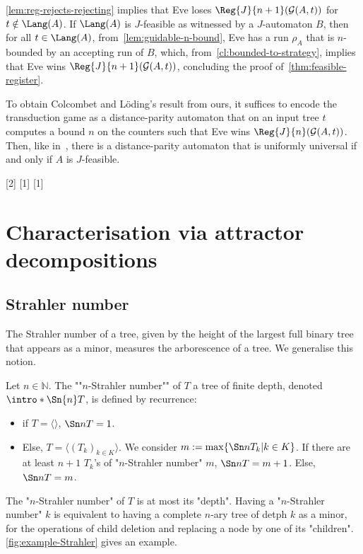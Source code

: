 \documentclass[a4paper,UKenglish,cleveref, autoref, thm-restate]{lipics-v2021}
\newcommand{\NN}{\mathbb{N}}
\newcommand{\F}{\mathcal{F}}
\newcommand{\G}{\mathcal{G}}
\begin{document}
\cref{lem:reg-rejects-rejecting} implies that Eve loses $\Reg{J}{n+1}(\G(A,t))$ for $t\notin \Lang(A)$. If $\Lang(A)$ is $J$-feasible as witnessed by a $J$-automaton $B$, then for all $t\in \Lang(A)$, from~\cref{lem:guidable-n-bound}, Eve has a run $\rho_A$ that is $n$-bounded by an accepting run of $B$, which, from~\cref{cl:bounded-to-strategy}, implies that Eve wins $\Reg{J}{n+1}(\G(A,t))$, concluding the proof of~\cref{thm:feasible-register}.

\begin{remark}\label{rmk:colcombet-loding}
To obtain Colcombet and L\"oding's result from ours, it suffices to encode the transduction game as a distance-parity automaton that on an input tree $t$ computes a bound $n$ on the counters such that Eve wins  $\Reg{J}{n}(\G(A,t))$. Then, like in~\cite[Lemma 3]{Guidable}, there is a distance-parity automaton that is uniformly universal if and only if $A$ is $J$-feasible.
\end{remark}  


\knowledgenewcommand{\Sn}[2]{}
\knowledgenewcommand{\Fo}{\cmdkl{\F}}
\knowledgenewcommand{\mapV}[1]{}
\knowledgenewcommand{\mapE}[1]{}



\section{Characterisation via attractor decompositions}\label{sec:strahler}

\subsection{Strahler number}

The Strahler number of a tree, given by the height of the largest full binary tree that appears as a minor, measures the arborescence of a tree. We generalise this notion.

\AP Let $n\in \NN$. The ""$n$-Strahler number"" of $T$ a tree of finite depth, denoted $\intro*\Sn{n}T$, is defined by recurrence:
\begin{itemize}
	\item if $T = \langle \rangle$, $\Sn n T=1$.
	\item Else, $T = \langle (T_k)_{k\in K}\rangle$. We consider $m := \max\{\Sn n {T_k}|k \in K\}$. If there are at least $n+1$ $T_k$'s of "$n$-Strahler number" $m$, $\Sn n T = m+1$. Else, $\Sn n T = m$.
\end{itemize}
The "$n$-Strahler number" of $T$ is at most its "depth". Having a "$n$-Strahler number" $k$ is equivalent to having a complete $n$-ary tree of detph $k$ as a minor, for the operations of child deletion and replacing a node by one of its "children".  \cref{fig:example-Strahler} gives an example.
\end{document}
